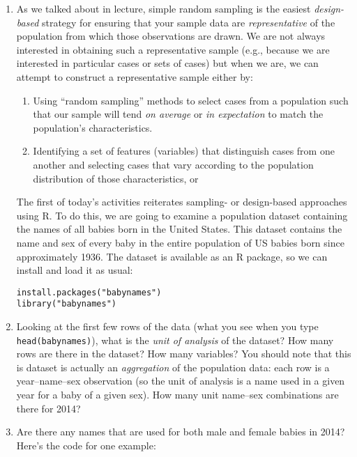 \documentclass[a4paper,12pt]{article}
\begin{document}
\begin{enumerate}
\item As we talked about in lecture, simple random sampling is the easiest \textit{design-based} strategy for ensuring that your sample data are \textit{representative} of the population from which those observations are drawn. We are not always interested in obtaining such a representative sample (e.g., because we are interested in particular cases or sets of cases) but when we are, we can attempt to construct a representative sample either by:

\begin{enumerate}
\item Using ``random sampling'' methods to select cases from a population such that our sample will tend \textit{on average} or \textit{in expectation} to match the population's characteristics.
\item Identifying a set of features (variables) that distinguish cases from one another and selecting cases that vary according to the population distribution of those characteristics, or
\end{enumerate}

The first of today's activities reiterates sampling- or design-based approaches using R. To do this, we are going to examine a population dataset containing the names of all babies born in the United States. This dataset contains the name and sex of every baby in the entire population of US babies born since approximately 1936. The dataset is available as an R package, so we can install and load it as usual:

\begin{verbatim}
install.packages("babynames")
library("babynames")
\end{verbatim}

\item Looking at the first few rows of the data (what you see when you type \texttt{head(babynames)}), what is the \textit{unit of analysis} of the dataset? How many rows are there in the dataset? How many variables? You should note that this is dataset is actually an \textit{aggregation} of the population data: each row is a year--name--sex observation (so the unit of analysis is a name used in a given year for a baby of a given sex). How many unit name--sex combinations are there for 2014?

\item Are there any names that are used for both male and female babies in 2014? Here's the code for one example:


\end{enumerate}
\end{document}
